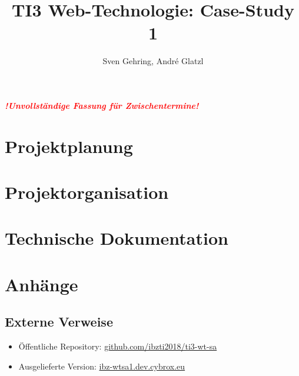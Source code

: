 \documentclass{article}
\begin{document}

\title{TI3 Web-Technologie: Case-Study 1}
\author{Sven Gehring, André Glatzl}
\date{}
\maketitle

\begin{abstract}

\end{abstract}

\vspace{3cm}
\begin{center}
  \textcolor{red}{\textbf{\emph{!Unvollständige Fassung für Zwischentermine!}}}
\end{center}

\clearpage
\tableofcontents

\clearpage
\section{Projektplanung}







\clearpage
\section{Projektorganisation}



\clearpage
\section{Technische Dokumentation}


\clearpage
\section{Anhänge}
\subsection{Externe Verweise}
\begin{itemize}
  \item Öffentliche Repository: \href{https://github.com/ibzti2018/ti3-wt-sa}{github.com/ibzti2018/ti3-wt-sa}
  \item Ausgelieferte Version: \href{https://ibz-wtsa1.dev.cybrox.eu/}{ibz-wtsa1.dev.cybrox.eu}
\end{itemize}
\end{document}

